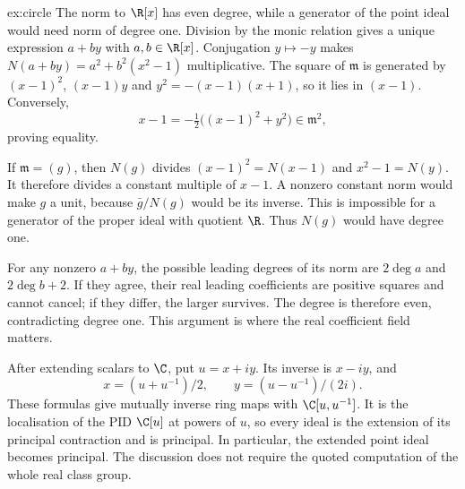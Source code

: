 \begin{solution}{ex:circle}
\idea The norm to $\R[x]$ has even degree, while a generator of the point ideal would need norm of degree one.
\writeup Division by the monic relation gives a unique expression $a+by$ with $a,b\in\R[x]$. Conjugation $y\mapsto-y$ makes
$N(a+by)=a^2+b^2(x^2-1)$ multiplicative. The square of $\mathfrak m$ is generated by $(x-1)^2$, $(x-1)y$ and $y^2=-(x-1)(x+1)$, so it lies in $(x-1)$. Conversely,
\[
 x-1=-\tfrac12\bigl((x-1)^2+y^2\bigr)\in\mathfrak m^2,
\]
proving equality.

If $\mathfrak m=(g)$, then $N(g)$ divides $(x-1)^2=N(x-1)$ and $x^2-1=N(y)$. It therefore divides a constant multiple of $x-1$. A nonzero constant norm would make $g$ a unit, because $\bar g/N(g)$ would be its inverse. This is impossible for a generator of the proper ideal with quotient $\R$. Thus $N(g)$ would have degree one.

For any nonzero $a+by$, the possible leading degrees of its norm are $2\deg a$ and $2\deg b+2$. If they agree, their real leading coefficients are positive squares and cannot cancel; if they differ, the larger survives. The degree is therefore even, contradicting degree one. This argument is where the real coefficient field matters.

After extending scalars to $\C$, put $u=x+iy$. Its inverse is $x-iy$, and
\[
 x=(u+u^{-1})/2,\qquad y=(u-u^{-1})/(2i).
\]
These formulas give mutually inverse ring maps with $\C[u,u^{-1}]$. It is the localisation of the PID $\C[u]$ at powers of $u$, so every ideal is the extension of its principal contraction and is principal. In particular, the extended point ideal becomes principal. The discussion does not require the quoted computation of the whole real class group.
\end{solution}


